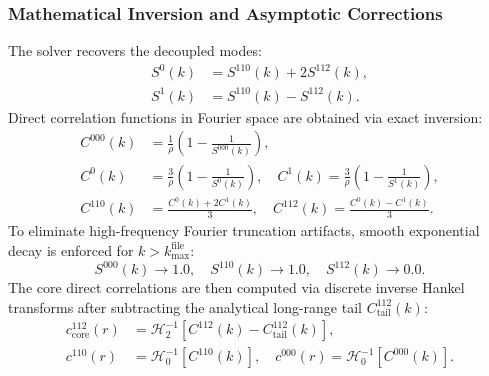 \documentclass[11pt,a4paper]{article}
\begin{document}
\subsubsection{Mathematical Inversion and Asymptotic Corrections}
The solver recovers the decoupled modes:
\begin{align}
    S^0(k) &= S^{110}(k) + 2 S^{112}(k), \\
    S^1(k) &= S^{110}(k) - S^{112}(k).
\end{align}
Direct correlation functions in Fourier space are obtained via exact inversion:
\begin{align}
    C^{000}(k) &= \frac{1}{\rho}\left( 1 - \frac{1}{S^{000}(k)} \right), \\
    C^0(k) &= \frac{3}{\rho}\left( 1 - \frac{1}{S^0(k)} \right), \quad C^1(k) = \frac{3}{\rho}\left( 1 - \frac{1}{S^1(k)} \right), \\
    C^{110}(k) &= \frac{C^0(k) + 2 C^1(k)}{3}, \quad C^{112}(k) = \frac{C^0(k) - C^1(k)}{3}.
\end{align}
To eliminate high-frequency Fourier truncation artifacts, smooth exponential decay is enforced for $k > k_{\max}^{\text{file}}$:
\begin{equation}
    S^{000}(k) \to 1.0, \quad S^{110}(k) \to 1.0, \quad S^{112}(k) \to 0.0.
\end{equation}
The core direct correlations are then computed via discrete inverse Hankel transforms after subtracting the analytical long-range tail $C_{\text{tail}}^{112}(k)$:
\begin{align}
    c_{\text{core}}^{112}(r) &= \mathcal{H}_2^{-1}\left[ C^{112}(k) - C_{\text{tail}}^{112}(k) \right], \\
    c^{110}(r) &= \mathcal{H}_0^{-1}\left[ C^{110}(k) \right], \quad c^{000}(r) = \mathcal{H}_0^{-1}\left[ C^{000}(k) \right].
\end{align}
\end{document}
